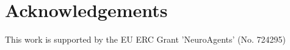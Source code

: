 \newpage
 
\chapter*{Acknowledgements}

This work is supported by the EU ERC Grant 'NeuroAgents' (No. 724295)

%    
\newpage


 \setcounter{tocdepth}{2}
 \tableofcontents


